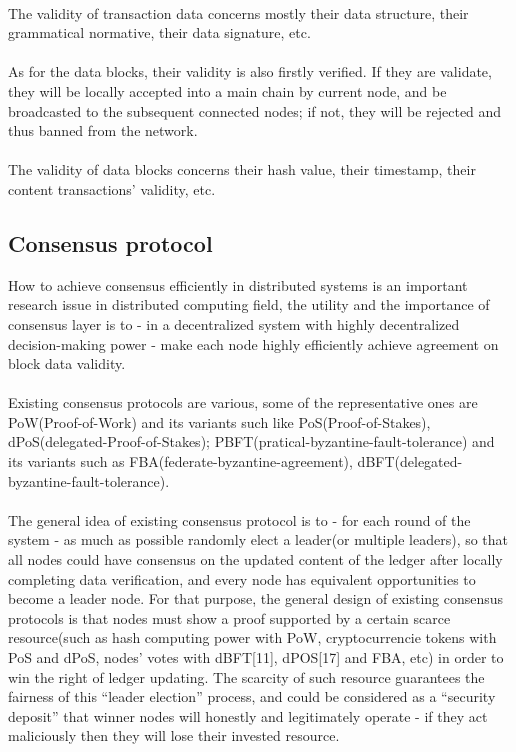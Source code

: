 \documentclass[doublespacing]{bmcart}
\begin{document}
\begin{CJK*}{UTF8}{gbsn}
\paragraph{} The validity of transaction data concerns mostly their data structure, their grammatical normative, their data signature, etc. 
\paragraph{} As for the data blocks, their validity is also firstly verified. If they are validate, they will be locally accepted into a main chain by current node, and be broadcasted to the subsequent connected nodes; if not, they will be rejected and thus banned from the network.
\paragraph{} The validity of data blocks concerns their hash value, their timestamp, their content transactions' validity, etc.
\subsection{Consensus protocol}
How to achieve consensus efficiently in distributed systems is an important research issue in distributed computing field, the utility and the importance of consensus layer is to - in a decentralized system with highly decentralized decision-making power - make each node highly efficiently achieve agreement on block data validity.
\paragraph{} Existing consensus protocols are various, some of the representative ones are PoW(Proof-of-Work) and its variants such like PoS(Proof-of-Stakes), dPoS(delegated-Proof-of-Stakes); PBFT(pratical-byzantine-fault-tolerance) and its variants such as FBA(federate-byzantine-agreement), dBFT(delegated-byzantine-fault-tolerance). 
\paragraph{} The general idea of existing consensus protocol is to - for each round of the system - as much as possible randomly elect a leader(or multiple leaders), so that all nodes could have consensus on the updated content of the ledger after locally completing data verification, and every node has equivalent opportunities to become a leader node. For that purpose, the general design of existing consensus protocols is that nodes must show a proof supported by a certain scarce resource(such as hash computing power with PoW, cryptocurrencie tokens with PoS and dPoS, nodes' votes with dBFT[11], dPOS[17] and FBA, etc) in order to win the right of ledger updating. The scarcity of such resource guarantees the fairness of this ``leader election'' process, and could be considered as a ``security deposit'' that winner nodes will honestly and legitimately operate - if they act maliciously then they will lose their invested resource.

\end{CJK*}
\end{document}

